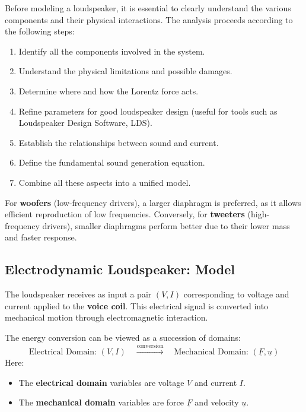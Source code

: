 Before modeling a loudspeaker, it is essential to clearly understand the various components and their physical interactions. The analysis proceeds according to the following steps:

\begin{enumerate}
    \item Identify all the components involved in the system.
    \item Understand the physical limitations and possible damages.
    \item Determine where and how the Lorentz force acts.
    \item Refine parameters for good loudspeaker design (useful for tools such as Loudspeaker Design Software, LDS).
    \item Establish the relationships between sound and current.
    \item Define the fundamental sound generation equation.
    \item Combine all these aspects into a unified model.
\end{enumerate}

For \textbf{woofers} (low-frequency drivers), a larger diaphragm is preferred, as it allows efficient reproduction of low frequencies. Conversely, for \textbf{tweeters} (high-frequency drivers), smaller diaphragms perform better due to their lower mass and faster response.

\subsection{Electrodynamic Loudspeaker: Model}

The loudspeaker receives as input a pair \((V, I)\) corresponding to voltage and current applied to the \textbf{voice coil}. This electrical signal is converted into mechanical motion through electromagnetic interaction.

The energy conversion can be viewed as a succession of domains:
\[
\text{Electrical Domain: } (V, I) \quad \xrightarrow{\text{conversion}} \quad \text{Mechanical Domain: } (\underline{F}, \underline{u})
\]
\clearpage
Here:
\begin{itemize}
    \item The \textbf{electrical domain} variables are voltage \(V\) and current \(I\).
    \item The \textbf{mechanical domain} variables are force \(\underline{F}\) and velocity \(\underline{u}\).
\end{itemize}

